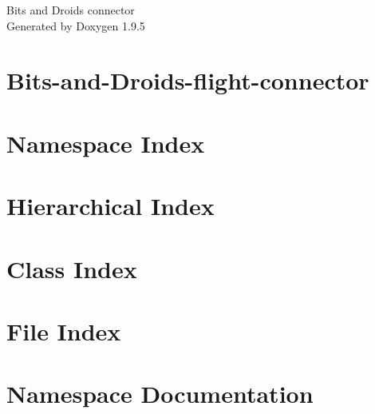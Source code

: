 \documentclass[twoside]{book}
\newcommand{\+}{\discretionary{\mbox{\scriptsize$\hookleftarrow$}}{}{}}
\newcommand{\clearemptydoublepage}{%
    \newpage{\pagestyle{empty}\cleardoublepage}%
  }
\begin{document}
  \raggedbottom
    \hypersetup{pageanchor=false,
                bookmarksnumbered=true,
                pdfencoding=unicode
               }
  \begin{titlepage}
  \vspace*{7cm}
  \begin{center}%
  {\Large Bits and Droids connector}\\
  \vspace*{1cm}
  {\large Generated by Doxygen 1.9.5}\\
  \end{center}
  \end{titlepage}
  \clearemptydoublepage
  \tableofcontents
  \clearemptydoublepage
  \hypersetup{pageanchor=true}
\chapter{Bits-\/and-\/\+Droids-\/flight-\/connector}
\label{md__r_e_a_d_m_e}

\chapter{Namespace Index}

\chapter{Hierarchical Index}

\chapter{Class Index}

\chapter{File Index}

\chapter{Namespace Documentation}



\end{document}
